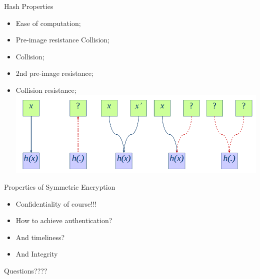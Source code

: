 \documentclass[12pt]{beamer}
\begin{document}
\begin{frame}{Hash Properties}
\begin{itemize}
\item Ease of computation;\pause
\item Pre-image resistance Collision;\pause
\item Collision;\pause
\item 2nd pre-image resistance;\pause
\item Collision resistance;\\\pause
\includegraphics[scale=.3]{hash_properties.png}
\end{itemize}
\end{frame}


\begin{frame}{Properties of Symmetric Encryption}
\begin{itemize}
\item Confidentiality of course!!!
\item How to achieve authentication?
\item And timeliness?
\item And Integrity
\end{itemize}
\end{frame}

{
\begin{frame}

{\LARGE Questions????}

\end{frame}
}
\end{document}
